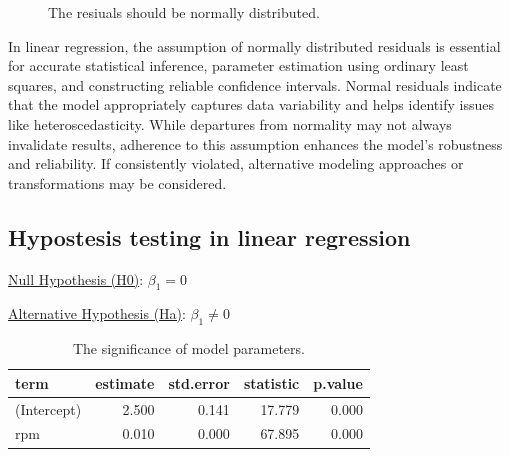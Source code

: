 \documentclass[
  a4paper,
]{scrbook}
\begin{document}
\begin{figure}[H]


\caption{\label{fig-lm-resid-qq}The resiuals should be normally
distributed.}

\end{figure}%

In linear regression, the assumption of normally distributed residuals
is essential for accurate statistical inference, parameter estimation
using ordinary least squares, and constructing reliable confidence
intervals. Normal residuals indicate that the model appropriately
captures data variability and helps identify issues like
heteroscedasticity. While departures from normality may not always
invalidate results, adherence to this assumption enhances the model's
robustness and reliability. If consistently violated, alternative
modeling approaches or transformations may be considered.

\subsection{Hypostesis testing in linear
regression}\label{hypostesis-testing-in-linear-regression}

\hyperref[H0]{Null Hypothesis (H0)}: \(\beta_1 = 0\)

\hyperref[Ha]{Alternative Hypothesis (Ha)}: \(\beta_1 \neq 0\)

\begingroup
\fontsize{12.0pt}{14.4pt}\selectfont

\begin{longtable}{lrrrr}

\caption{\label{tbl-lm-t-test}The significance of model parameters.}

\tabularnewline

\toprule
term & estimate & std.error & statistic & p.value \\ 
\midrule\addlinespace[2.5pt]
(Intercept) & 2.500 & 0.141 & 17.779 & 0.000 \\ 
rpm & 0.010 & 0.000 & 67.895 & 0.000 \\ 
\bottomrule

\end{longtable}
\end{document}

